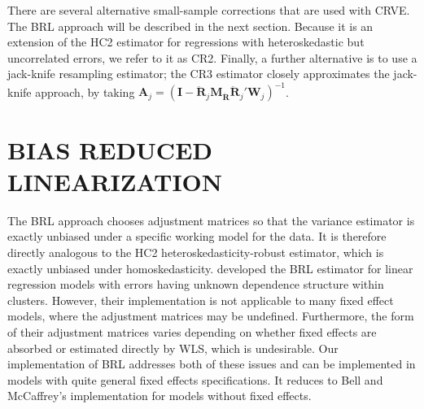\documentclass[12pt]{article}\usepackage[]{graphicx}\usepackage[]{color}
\newcommand{\bm}{\mathbf}
\begin{document}
There are several alternative small-sample corrections that are used with CRVE. The BRL approach will be described in the next section. Because it is an extension of the HC2 estimator for regressions with heteroskedastic but uncorrelated errors, we refer to it as CR2. Finally, a further alternative is to use a jack-knife resampling estimator; the CR3 estimator closely approximates the jack-knife approach, by taking $\bm{A}_j = \left(\bm{I} - \bm{\ddot{R}}_j \bm{M_{\ddot{R}}}\bm{\ddot{R}}_j'\bm{W}_j\right)^{-1}$. 

\section{BIAS REDUCED LINEARIZATION}
\label{sec:BRL}

The BRL approach chooses adjustment matrices so that the variance estimator is exactly unbiased under a specific working model for the data. It is therefore directly analogous to the HC2 heteroskedasticity-robust estimator, which is exactly unbiased under homoskedasticity. 
\citet{Bell2002bias} developed the BRL estimator for linear regression models with errors having unknown dependence structure within clusters. 
However, their implementation is not applicable to many fixed effect models, where the adjustment matrices may be undefined. Furthermore, the form of their adjustment matrices varies depending on whether fixed effects are absorbed or estimated directly by WLS, which is undesirable. Our implementation of BRL addresses both of these issues and can be implemented in models with quite general fixed effects specifications. It reduces to Bell and McCaffrey's implementation for models without fixed effects. 
\end{document}
